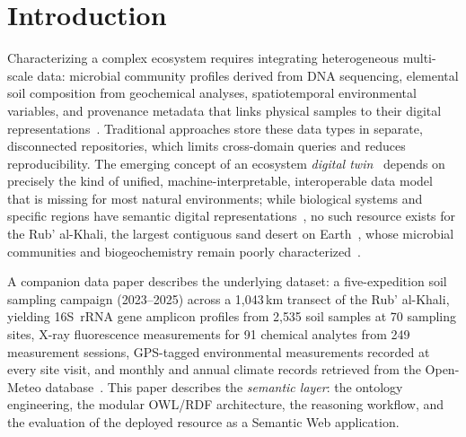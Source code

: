 \documentclass[11pt,a4paper]{article}
\begin{document}
\section{Introduction}

Characterizing a complex ecosystem requires integrating heterogeneous
multi-scale data: microbial community profiles derived from DNA
sequencing, elemental soil composition from geochemical analyses,
spatiotemporal environmental variables, and provenance metadata that
links physical samples to their digital
representations~\cite{fierer2017}. Traditional approaches store these
data types in separate, disconnected repositories, which limits
cross-domain queries and reduces reproducibility. The emerging concept
of an ecosystem \emph{digital twin}~\cite{digitaltwin2021,
destinationearth,khan2025,iglesias2026} depends on precisely the kind
of unified, machine-interpretable, interoperable data model that is
missing for most natural environments; while biological systems and
specific regions have semantic digital
representations~\cite{biodigitaltwin}, no such resource exists for the
Rub' al-Khali, the largest contiguous sand desert on
Earth~\cite{mandaville_1986}, whose microbial communities and
biogeochemistry remain poorly characterized~\cite{makhalanyane2015}.

A companion data paper describes the underlying dataset: a
five-expedition soil sampling campaign (2023--2025) across a
1{,}043\,km transect of the Rub' al-Khali, yielding 16S~rRNA gene
amplicon profiles from 2{,}535 soil samples at 70 sampling sites,
X-ray fluorescence measurements for 91 chemical analytes from
249 measurement sessions, GPS-tagged environmental measurements
recorded at every site visit, and monthly and annual climate records
retrieved from the Open-Meteo database~\cite{openmeteo,
gigascience_companion}. This paper describes the \emph{semantic
layer}: the ontology engineering, the modular OWL/RDF architecture,
the reasoning workflow, and the evaluation of the deployed resource as
a Semantic Web application.
\end{document}
